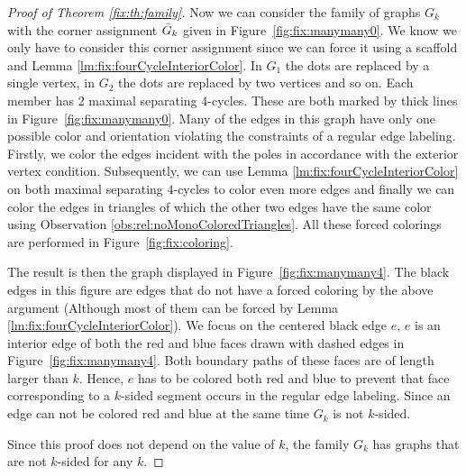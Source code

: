 \begin{proof}[Proof of Theorem \ref{fix:th:family}]
  Now we can consider the family of graphs $G_k$ with the corner assignment $\bar{G}_k$ given in Figure~\ref{fig:fix:manymany0}.
  We know we only have to consider this corner assignment since we can force it using a scaffold and Lemma \ref{lm:fix:fourCycleInteriorColor}.
  In $G_1$ the dots are replaced by a single vertex, in $G_2$ the dots are replaced by two vertices and so on.
  Each member has 2 maximal separating $4$-cycles.
  These are both marked by thick lines in Figure~\ref{fig:fix:manymany0}.
  Many of the edges in this graph have only one possible color and orientation violating the constraints of a regular edge labeling.
  Firstly, we color the edges incident with the poles in accordance with the exterior vertex condition.
  Subsequently, we can use Lemma \ref{lm:fix:fourCycleInteriorColor} on both maximal separating $4$-cycles to color even more edges and finally we can color the edges in triangles of which the other two edges have  the same color using Observation \ref{obs:rel:noMonoColoredTriangles}.
  All these forced colorings are performed in Figure~\ref{fig:fix:coloring}.

  The result is then the graph displayed in Figure~\ref{fig:fix:manymany4}. The black edges in this figure are edges that do not have a forced coloring by the above argument (Although most of them can be forced by Lemma \ref{lm:fix:fourCycleInteriorColor}).
  We focus on the centered black edge $e$, $e$ is an interior edge of both the red and blue faces drawn with dashed edges in Figure~\ref{fig:fix:manymany4}. Both boundary paths of these faces are of length larger than $k$. Hence, $e$ has to be colored both red and blue to prevent that face corresponding to a $k$-sided segment occurs in the regular edge labeling. Since an edge can not be colored red and blue at the same time $G_k$ is not $k$-sided.

  Since this proof does not depend on the value of $k$, the family $G_k$ has graphs that are not $k$-sided for any $k$.
\end{proof}


  \quad

  \quad

